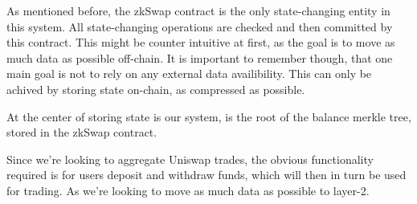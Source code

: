 \documentclass[11pt,twoside,a4paper,final]{book}
\begin{document}
As mentioned before, the zkSwap contract is the only state-changing entity in this system. All state-changing operations are checked and then committed by this contract. This might be counter intuitive at first, as the goal is to move as much data as possible off-chain. It is important to remember though, that one main goal is not to rely on any external data availibility. This can only be achived by storing state on-chain, as compressed as possible. 

At the center of storing state is our system, is the root of the balance merkle tree, stored in the zkSwap contract. 


Since we're looking to aggregate Uniswap trades, the obvious functionality required is for users deposit and withdraw funds, which will then in turn be used for trading. As we're looking to move as much data as possible to layer-2. 






















\end{document}
